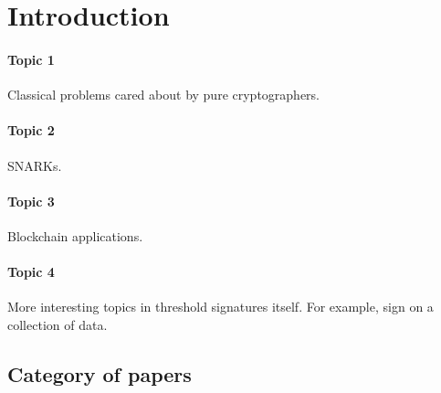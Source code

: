 
\section{Introduction}

\paragraph{Topic 1} Classical problems cared about by pure cryptographers. 
\paragraph{Topic 2} SNARKs. 
\paragraph{Topic 3} Blockchain applications.  
\paragraph{Topic 4} More interesting topics in threshold signatures itself. 
For example, sign on a collection of data. 


\subsection{Category of papers}

